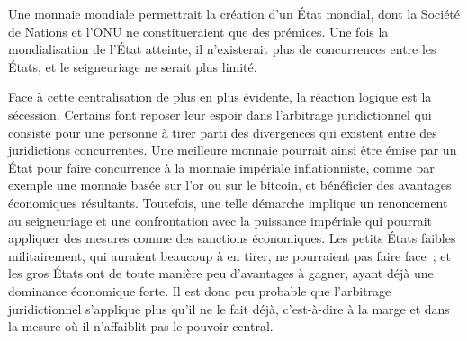 Une monnaie mondiale permettrait la création d'un État mondial, dont la Société de Nations et l'ONU ne constitueraient que des prémices. Une fois la mondialisation de l'État atteinte, il n'existerait plus de concurrences entre les États, et le seigneuriage ne serait plus limité.

Face à cette centralisation de plus en plus évidente, la réaction logique est la sécession. Certains font reposer leur espoir dans l'arbitrage juridictionnel qui consiste pour une personne à tirer parti des divergences qui existent entre des juridictions concurrentes. Une meilleure monnaie pourrait ainsi être émise par un État pour faire concurrence à la monnaie impériale inflationniste, comme par exemple une monnaie basée sur l'or ou sur le bitcoin, et bénéficier des avantages économiques résultants. Toutefois, une telle démarche implique un renoncement au seigneuriage et une confrontation avec la puissance impériale qui pourrait appliquer des mesures comme des sanctions économiques. Les petits États faibles militairement, qui auraient beaucoup à en tirer, ne pourraient pas faire face~; et les gros États ont de toute manière peu d'avantages à gagner, ayant déjà une dominance économique forte. Il est donc peu probable que l'arbitrage juridictionnel s'applique plus qu'il ne le fait déjà, c'est-à-dire à la marge et dans la mesure où il n'affaiblit pas le pouvoir central. %

